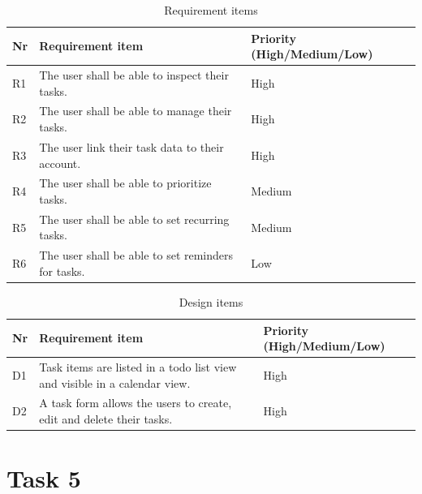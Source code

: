 \documentclass{article}
\begin{document}
\begin{table}[h]
  \centering
  \begin{tabularx}{\textwidth}{l|X|l}
    \toprule
    \textbf{Nr} & \textbf{Requirement item}                          & \textbf{Priority (High/Medium/Low)} \\
    \hline\hline
    R1          & The user shall be able to inspect their tasks.     & High                                \\
    \hline
    R2          & The user shall be able to manage their tasks.      & High                                \\
    \hline
    R3          & The user link their task data to their account.    & High                                \\
    \hline
    R4          & The user shall be able to prioritize tasks.        & Medium                              \\
    \hline
    R5          & The user shall be able to set recurring tasks.     & Medium                              \\
    \hline
    R6          & The user shall be able to set reminders for tasks. & Low                                 \\
    \bottomrule
  \end{tabularx}
  \caption{Requirement items}
  \label{Requirement items}
\end{table}

\begin{table}[h]
  \centering
  \begin{tabularx}{\textwidth}{l|X|l}
    \toprule
    \textbf{Nr} & \textbf{Requirement item}                                                 & \textbf{Priority (High/Medium/Low)} \\
    \hline\hline
    D1          & Task items are listed in a todo list view and visible in a calendar view. & High                                \\
    \hline
    D2          & A task form allows the users to create, edit and delete their tasks.      & High                                \\
    \bottomrule
  \end{tabularx}
  \caption{Design items}
  \label{Design items}
\end{table}

\clearpage

\section{Task 5}
\end{document}
